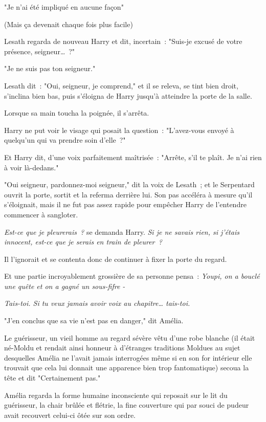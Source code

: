 "Je n'ai été impliqué en aucune façon"

(Mais ça devenait chaque fois plus facile)

Lesath regarda de nouveau Harry et dit, incertain~: "Suis-je excusé de votre présence, seigneur…~?"

"Je ne suis pas ton seigneur."

Lesath dit~: "Oui, seigneur, je comprend," et il se releva, se tint bien droit, s'inclina bien bas, puis s'éloigna de Harry jusqu'à atteindre la porte de la salle.

Lorsque sa main toucha la poignée, il s'arrêta.

Harry ne put voir le visage qui posait la question~: "L'avez-vous envoyé à quelqu'un qui va prendre soin d'elle~?"

Et Harry dit, d'une voix parfaitement maîtrisée~: "Arrête, s'il te plaît. Je n'ai rien à voir là-dedans."

"Oui seigneur, pardonnez-moi seigneur," dit la voix de Lesath~; et le Serpentard ouvrit la porte, sortit et la referma derrière lui. Son pas accéléra à mesure qu'il s'éloignait, mais il ne fut pas assez rapide pour empêcher Harry de l'entendre commencer à sangloter.

\emph{Est-ce que je pleurerais~?} se demanda Harry. \emph{Si je ne savais rien, si j'étais innocent, est-ce que je serais en train de pleurer~?}

Il l'ignorait et se contenta donc de continuer à fixer la porte du regard.

Et une partie incroyablement grossière de sa personne pensa~: \emph{Youpi, on a bouclé une quête et on a gagné un sous-fifre -}

\emph{Tais-toi. Si tu veux jamais avoir voix au chapitre… tais-toi.}


"J'en conclus que sa vie n'est pas en danger," dit Amélia.

Le guérisseur, un vieil homme au regard sévère vêtu d'une robe blanche (il était né-Moldu et rendait ainsi honneur à d'étranges traditions Moldues au sujet desquelles Amélia ne l'avait jamais interrogées même si en son for intérieur elle trouvait que cela lui donnait une apparence bien trop fantomatique) secoua la tête et dit "Certainement pas."

Amélia regarda la forme humaine inconsciente qui reposait sur le lit du guérisseur, la chair brûlée et flétrie, la fine couverture qui par souci de pudeur avait recouvert celui-ci ôtée sur son ordre.


